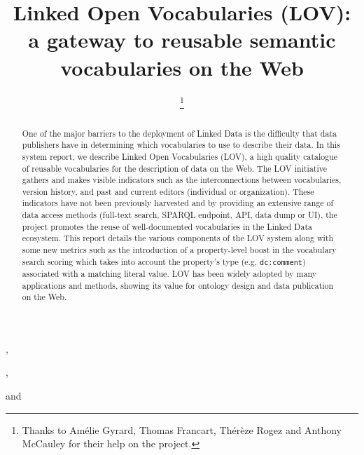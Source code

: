 \documentclass{iosart2c}
\begin{document}
\begin{frontmatter}                        %

%
\title{Linked Open Vocabularies (LOV): a gateway to reusable semantic vocabularies on the Web}





\author[A]{ \thanks{Thanks to Am\'elie Gyrard, Thomas Francart, Th\'er\`{e}ze Rogez and Anthony McCauley for their help on the project.}},
\author[B]{ },
\author[C]{ }
and
\author[D]{ }
\address[A]{Fujitsu (Ireland) Limited, Swords, Co. Dublin, Ireland\\
E-mail: pierre-yves.vandenbussche@ie.fujitsu.com}
\address[B]{Mondeca, 35 boulevard de Strasbourg, 75010 Paris, France\\
E-mail: ghislain.atemezing@mondeca.com}
\address[C]{Ontology Engineering Group (OEG), 
Universidad Polit\'ecnica de Madrid, Madrid, Spain\\
E-mail: mpoveda@fi.upm.es}
\address[D]{Mondeca, 35 boulevard de Strasbourg, 75010 Paris, France
\\
E-mail: bernard.vatant@mondeca.com}



\begin{abstract}

One of the major barriers to the deployment of 
Linked Data is the difficulty that data publishers have in determining which vocabularies to use to describe their data. In this system report, we describe Linked Open Vocabularies (LOV), a high quality catalogue 
of reusable vocabularies for the description of data on the Web. The LOV initiative gathers and makes visible indicators such as the interconnections between vocabularies, version history, and past and current editors 
(individual or organization). These indicators have not been previously harvested and by providing an extensive range of data access methods (full-text search, SPARQL endpoint, API, data dump or UI), the project promotes the reuse of well-documented vocabularies in the Linked Data ecosystem. This report details the various components of the LOV system along with some new metrics  such as the introduction of a property-level boost 
in the vocabulary search scoring which takes into account the property's type (e.g, \texttt{dc:comment}) associated with a matching literal value. 
LOV has been widely adopted by many applications and methods, showing its value for ontology design and data publication on the Web. 


\end{abstract}
\end{frontmatter}
\end{document}
